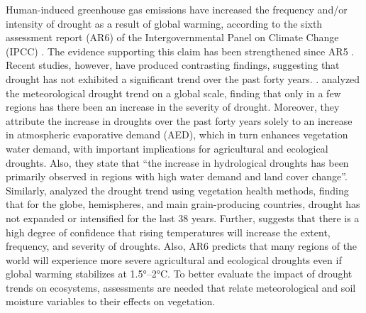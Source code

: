 \documentclass[
  authoryear,
  preprint,
  3p,
  onecolumn]{elsarticle}
\begin{document}
Human-induced greenhouse gas emissions have increased the frequency
and/or intensity of drought as a result of global warming, according to
the sixth assessment report (AR6) of the Intergovernmental Panel on
Climate Change (IPCC) \citep{IPCC2023}. The evidence supporting this
claim has been strengthened since AR5 \citep{IPCC2013}. Recent studies,
however, have produced contrasting findings, suggesting that drought has
not exhibited a significant trend over the past forty years.
\citep{Vicente-Serrano2022, Kogan2020}. \citet{Vicente-Serrano2022}
analyzed the meteorological drought trend on a global scale, finding
that only in a few regions has there been an increase in the severity of
drought. Moreover, they attribute the increase in droughts over the past
forty years solely to an increase in atmospheric evaporative demand
(AED), which in turn enhances vegetation water demand, with important
implications for agricultural and ecological droughts. Also, they state
that ``the increase in hydrological droughts has been primarily observed
in regions with high water demand and land cover change''. Similarly,
\citet{Kogan2020} analyzed the drought trend using vegetation health
methods, finding that for the globe, hemispheres, and main
grain-producing countries, drought has not expanded or intensified for
the last 38 years. Further, \citet{IPCC2021} suggests that there is a
high degree of confidence that rising temperatures will increase the
extent, frequency, and severity of droughts. Also, AR6 \citep{IPCC2023}
predicts that many regions of the world will experience more severe
agricultural and ecological droughts even if global warming stabilizes
at 1.5°--2°C. To better evaluate the impact of drought trends on
ecosystems, assessments are needed that relate meteorological and soil
moisture variables to their effects on vegetation.
\end{document}
